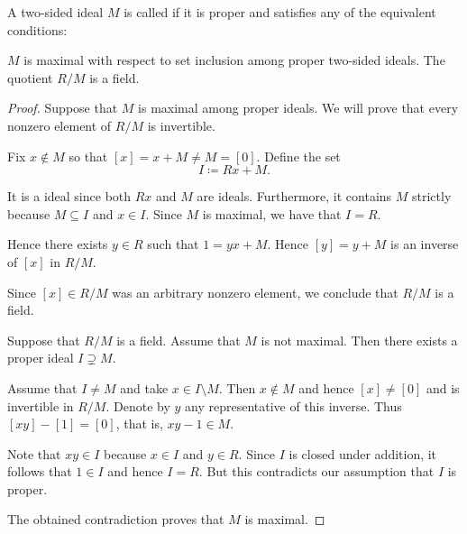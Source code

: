 \begin{definition}\label{def:maximal_ring_ideal}
  A two-sided ideal \( M \) is called  if it is proper and satisfies any of the equivalent conditions:
  \begin{DefEnum}
     \( M \) is maximal with respect to set inclusion among proper two-sided ideals.
     The quotient \( R / M \) is a field.
  \end{DefEnum}
\end{definition}
\begin{proof}
   Suppose that \( M \) is maximal among proper ideals. We will prove that every nonzero element of \( R / M \) is invertible.

  Fix \( x \not\in M \) so that \( [x] = x + M \neq M = [0] \). Define the set
  \begin{equation*}
    I \coloneqq Rx + M.
  \end{equation*}

  It is a ideal since both \( Rx \) and \( M \) are ideals. Furthermore, it contains \( M \) strictly because \( M \subseteq I \) and \( x \in I \). Since \( M \) is maximal, we have that \( I = R \).

  Hence there exists \( y \in R \) such that \( 1 = yx + M \). Hence \( [y] = y + M \) is an inverse of \( [x] \) in \( R / M \).

  Since \( [x] \in R / M \) was an arbitrary nonzero element, we conclude that \( R / M \) is a field.

   Suppose that \( R / M \) is a field. Assume that \( M \) is not maximal. Then there exists a proper ideal \( I \supsetneq M \).

  Assume that \( I \neq M \) and take \( x \in I \setminus M \). Then \( x \not\in M \) and hence \( [x] \neq [0] \) and is invertible in \( R / M \). Denote by \( y \) any representative of this inverse. Thus \( [xy] - [1] = [0] \), that is, \( xy - 1 \in M \).

  Note that \( xy \in I \) because \( x \in I \) and \( y \in R \). Since \( I \) is closed under addition, it follows that \( 1 \in I \) and hence \( I = R \). But this contradicts our assumption that \( I \) is proper.

  The obtained contradiction proves that \( M \) is maximal.
\end{proof}

